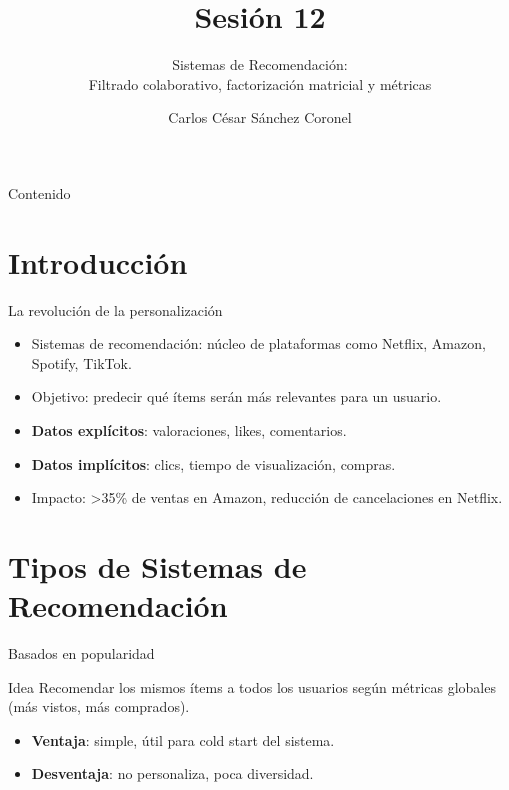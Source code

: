 \documentclass[aspectratio=169, 10pt, xcolor=table]{beamer}
\title[SESIÓN 12]{\textbf{Sesión 12}}
\subtitle{Sistemas de Recomendación: \\ Filtrado colaborativo, factorización matricial y métricas}
\author[Prof. C. Sánchez]{Carlos César Sánchez Coronel}
\institute{\textbf{MACHINE LEARNING}}
\date{}
\begin{document}
\begin{frame}
    \titlepage
\end{frame}

\begin{frame}{Contenido}
    \tableofcontents
\end{frame}

\section{Introducción}

\begin{frame}{La revolución de la personalización}
    \begin{itemize}
        \item Sistemas de recomendación: núcleo de plataformas como Netflix, Amazon, Spotify, TikTok.
        \item Objetivo: predecir qué ítems serán más relevantes para un usuario.
        \item \textbf{Datos explícitos}: valoraciones, likes, comentarios.
        \item \textbf{Datos implícitos}: clics, tiempo de visualización, compras.
        \item Impacto: >35\% de ventas en Amazon, reducción de cancelaciones en Netflix.
    \end{itemize}
\end{frame}

\section{Tipos de Sistemas de Recomendación}

\begin{frame}{Basados en popularidad}
    \begin{block}{Idea}
        Recomendar los mismos ítems a todos los usuarios según métricas globales (más vistos, más comprados).
    \end{block}
    \begin{itemize}
        \item \textbf{Ventaja}: simple, útil para cold start del sistema.
        \item \textbf{Desventaja}: no personaliza, poca diversidad.
    \end{itemize}
\end{frame}
\end{document}
